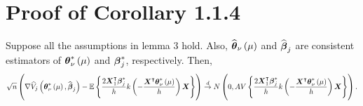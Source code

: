 \section{Proof of Corollary 1.1.4}
\begin{corollary}
	Suppose all the assumptions in lemma 3 hold. Also, $\widehat{\boldsymbol{\theta}}_{\nu}\left(\mu\right)$ and $\widehat{\boldsymbol{\beta}}_{j}$ are consistent estimators of $\boldsymbol{\theta}^*_{\nu}\left(\mu\right)$ and $\boldsymbol{\beta}_{j}^*$, respectively. Then, 
	\begin{gather}
	\begin{flalign*}
	\sqrt{n}\left(\nabla\widehat{V}_j\left(\boldsymbol{\theta}^*_{\nu}\left(\mu\right)  , \widehat{\boldsymbol{\beta}}_j\right) - \mathbb{E}\left\{\frac{2\boldsymbol{X}_{1}^{\intercal}\boldsymbol{\beta}^*_j}{h}k\left(-\frac{\boldsymbol{X}^{\intercal}\boldsymbol{\theta}^*_{\nu}\left(\mu\right)}{h}\right)\boldsymbol{X}\right\}\right)\overset{d}{\to}N\left(0,AV\left\{\frac{2\boldsymbol{X}_1^{\intercal}\boldsymbol{\beta}^*_j}{h}k\left(-\frac{\boldsymbol{X}^{\intercal}\boldsymbol{\theta}^*_{\nu}\left(\mu\right)}{h}\right)\boldsymbol{X}\right\}\right).
	\end{flalign*}
	\end{gather}
\end{corollary}
